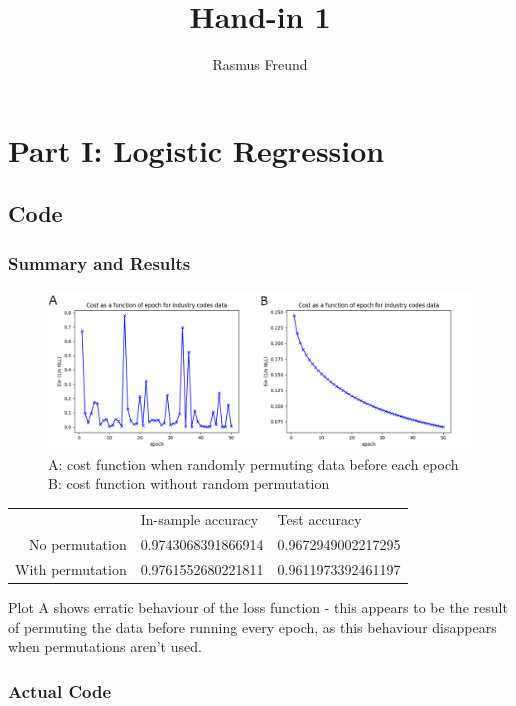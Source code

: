 \documentclass[english,11pt,a4paper,titlepage]{report}
\title{Hand-in 1}
\author{Rasmus Freund}
\begin{document}
	\maketitle
	
	\section*{Part I: Logistic Regression}
	\subsection*{Code}
	\subsubsection*{Summary and Results}
	
	\begin{figure}[h]
		\centering
		\includegraphics[width=0.9\linewidth]{h1git/results/logreg_text_cost_per_epoch_combined}
		\caption{A: cost function when randomly permuting data before each epoch B: cost function without random permutation}
		\label{fig:logregtextcostperepochcombined}
	\end{figure}
	
	\begin{table}[h]
	\begin{tabular}{rll}
							& In-sample accuracy 	& Test accuracy 		\\
		No permutation 		& 0.9743068391866914	& 0.9672949002217295	\\
		With permutation	& 0.9761552680221811	& 0.9611973392461197
		
	\end{tabular}
	\end{table}
		
		Plot A shows erratic behaviour of the loss function - this appears to be the result of permuting the data before running every epoch, as this behaviour disappears when permutations aren't used.
	
	\subsubsection{Actual Code}
		
\end{document}
